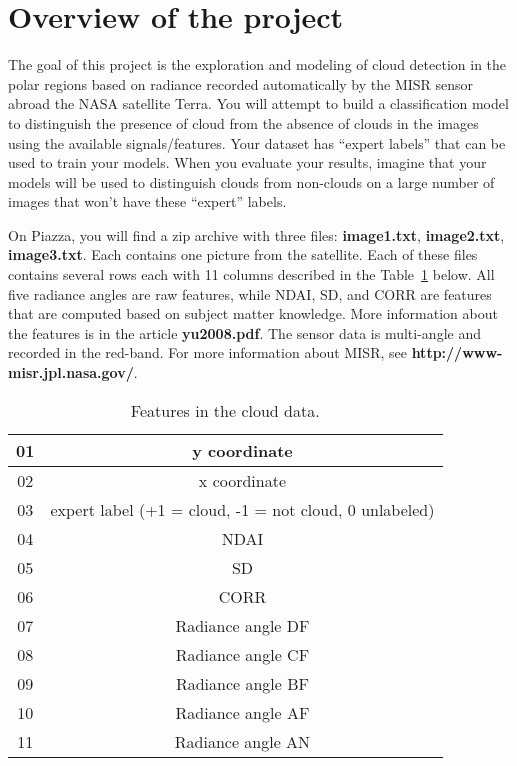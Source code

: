 \documentclass[11pt]{article}\usepackage[]{graphicx}\usepackage[]{color}
\begin{document}
\newpage

\section*{Overview of the project} %
\label{sec:overview_of_the_project}

The goal of this project is the exploration and modeling of cloud detection in 
the polar regions based on radiance recorded automatically by the MISR sensor 
abroad the NASA satellite Terra. You will attempt to build a classification 
model to distinguish the presence of cloud from the absence of clouds in
the images using the available signals/features. Your dataset has ``expert
labels'' that can be used to train your models. When you evaluate your
results, imagine that your models will be used to distinguish
clouds from non-clouds on a large number of images that won't have these 
``expert'' labels.

On Piazza, you will find a zip archive with three files: \textbf{image1.txt},
\textbf{image2.txt}, \textbf{image3.txt}. Each contains one picture from
the satellite. Each of these files contains several rows each with 11 columns 
described in the Table~\ref{tab:feature} below. All five radiance angles
are raw features, while NDAI, SD, and CORR are features that are computed
based on subject matter knowledge. More information about the features is
in the article \textbf{yu2008.pdf}. The sensor data is multi-angle and recorded
in the red-band. 
For more information about MISR, see \textbf{http://www-misr.jpl.nasa.gov/}.

\begin{table}[h]
\centering
\begin{tabular}{|c|c|}
\hline
 01 & y coordinate \\ \hline
 02 & x coordinate \\ \hline
 03 & expert label (+1 = cloud, -1 = not cloud, 0 unlabeled)\\ \hline
 04 & NDAI \\ \hline
 05 & SD \\ \hline
 06 & CORR \\ \hline
 07 & Radiance angle DF\\ \hline
 08 & Radiance angle CF\\ \hline
 09 & Radiance angle BF\\ \hline
 10 & Radiance angle AF\\ \hline
 11 & Radiance angle AN\\ \hline
\end{tabular}
\label{tab:feature}
\caption{Features in the cloud data.}
\end{table}
\end{document}
